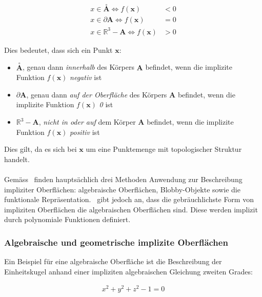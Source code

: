 \begin{align} \label{eq:surface_implicit_condition}
    x \in \overset{\circ}{\bm{A}} \Leftrightarrow f(\bm{x}) &< 0 \\
    x \in \partial \bm{A}         \Leftrightarrow f(\bm{x}) &= 0 \\
    x \in \mathbb{R}^{3} - \bm{A} \Leftrightarrow f(\bm{x}) &> 0
\end{align}

Dies bedeutet, dass sich ein Punkt $\bm{x}$:
\begin{itemize}
    \item $\overset{\circ}{\bm{A}}$, genau dann \textit{innerhalb} des Körpers
        $\bm{A}$ befindet, wenn die implizite Funktion $f(\bm{x})$ \textit{negativ}
        ist
    \item $\partial{\bm{A}}$, genau dann \textit{auf der Oberfläche} des
        Körpers $\bm{A}$ befindet, wenn die implizite Funktion $f(\bm{x})$
        \textit{0} ist
    \item $\mathbb{R}^{3} - \bm{A}$, \textit{nicht in oder auf} dem Körper
        $\bm{A}$ befindet, wenn die implizite Funktion $f(\bm{x})$ \textit{positiv}
        ist
\end{itemize}

Dies gilt, da es sich bei $ \bm{x} $ um eine Punktemenge mit topologischer
Struktur handelt.\\
\\
Gemäss~\cite{division_introduction_1996} finden hauptsächlich drei Methoden
Anwendung zur Beschreibung impliziter Oberflächen: algebraische Oberflächen,
Blobby-Objekte sowie die funktionale Repräsentation.~\cite{hart_sphere_1994}
gibt jedoch an, dass die gebräuchlichste Form von impliziten Oberflächen die
algebraischen Oberflächen sind. Diese werden implizit durch polynomiale
Funktionen definiert.\\

\subsubsection{Algebraische und geometrische implizite Oberflächen}
\label{ssubsec:implicit_surfaces_algebraic_geometric}

Ein Beispiel für eine algebraische Oberfläche ist die Beschreibung der
Einheitskugel anhand einer impliziten algebraischen Gleichung zweiten Grades:

\begin{gather} \label{eq:surface_immplicit_algebraic}
    x^{2} + y^{2} + z^{2} - 1 = 0
\end{gather}

